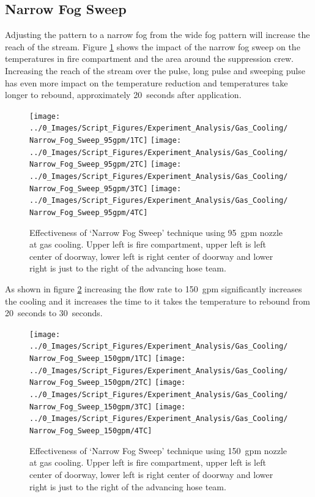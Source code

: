 \documentclass[12pt,oneside]{book}
\begin{document}
\subsection {Narrow Fog Sweep}
Adjusting the pattern to a narrow fog from the wide fog pattern will increase the reach of the stream. Figure \ref{fig:gas_narrow_fog_95} shows the impact of the narrow fog sweep on the temperatures in fire compartment and the area around the suppression crew. Increasing the reach of the stream over the pulse, long pulse and sweeping pulse has even more impact on the temperature reduction and temperatures take longer to rebound, approximately 20~seconds after application.

\begin{figure}[H]
\centering
\texttt{[image: ../0\_Images/Script\_Figures/Experiment\_Analysis/Gas\_Cooling/Narrow\_Fog\_Sweep\_95gpm/1TC]}
\texttt{[image: ../0\_Images/Script\_Figures/Experiment\_Analysis/Gas\_Cooling/Narrow\_Fog\_Sweep\_95gpm/2TC]}
\texttt{[image: ../0\_Images/Script\_Figures/Experiment\_Analysis/Gas\_Cooling/Narrow\_Fog\_Sweep\_95gpm/3TC]}
\texttt{[image: ../0\_Images/Script\_Figures/Experiment\_Analysis/Gas\_Cooling/Narrow\_Fog\_Sweep\_95gpm/4TC]}
\caption[Gas Cooling - Narrow Fog Sweep 95~gpm]{Effectiveness of `Narrow Fog Sweep' technique using 95~gpm nozzle at gas cooling. Upper left is fire compartment, upper left is left center of doorway, lower left is right center of doorway and lower right is just to the right of the advancing hose team.}
\label{fig:gas_narrow_fog_95}
\end{figure}

As shown in figure \ref{fig:gas_narrow_fog_150} increasing the flow rate to 150~gpm significantly increases the cooling and it increases the time to it takes the temperature to rebound from 20~seconds to 30~seconds. 

\begin{figure}[H]
\centering
\texttt{[image: ../0\_Images/Script\_Figures/Experiment\_Analysis/Gas\_Cooling/Narrow\_Fog\_Sweep\_150gpm/1TC]}
\texttt{[image: ../0\_Images/Script\_Figures/Experiment\_Analysis/Gas\_Cooling/Narrow\_Fog\_Sweep\_150gpm/2TC]}
\texttt{[image: ../0\_Images/Script\_Figures/Experiment\_Analysis/Gas\_Cooling/Narrow\_Fog\_Sweep\_150gpm/3TC]}
\texttt{[image: ../0\_Images/Script\_Figures/Experiment\_Analysis/Gas\_Cooling/Narrow\_Fog\_Sweep\_150gpm/4TC]}
\caption[Gas Cooling - Narrow Fog Sweep 150~gpm]{Effectiveness of `Narrow Fog Sweep' technique using 150~gpm nozzle at gas cooling. Upper left is fire compartment, upper left is left center of doorway, lower left is right center of doorway and lower right is just to the right of the advancing hose team.}
\label{fig:gas_narrow_fog_150}
\end{figure}
\end{document}
